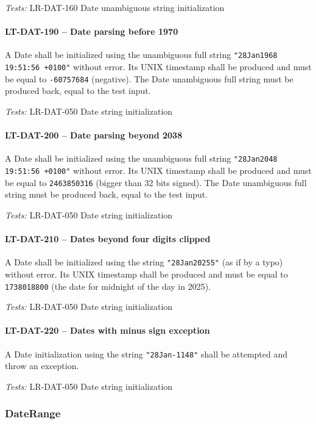 \textit{Tests: } LR-DAT-160 Date unambiguous string initialization

\paragraph{LT-DAT-190 -- Date parsing before 1970}
A Date shall be initialized using the unambiguous full string
\lstinline{"28Jan1968 19:51:56 +0100"} without error.
Its UNIX timestamp shall be produced and must be equal to
\lstinline{-60757684} (negative).
The Date unambiguous full string must be produced back,
equal to the test input.

\textit{Tests: } LR-DAT-050 Date string initialization

\paragraph{LT-DAT-200 -- Date parsing beyond 2038}
A Date shall be initialized using the unambiguous
full string \lstinline{"28Jan2048 19:51:56 +0100"} without error.
Its UNIX timestamp shall be produced and must be equal to
\lstinline{2463850316} (bigger than 32 bits signed).
The Date unambiguous full string must be produced back,
equal to the test input.

\textit{Tests: } LR-DAT-050 Date string initialization

\paragraph{LT-DAT-210 -- Dates beyond four digits clipped}
A Date shall be initialized using the string
\lstinline{"28Jan20255"} (as if by a typo) without error.
Its UNIX timestamp shall be produced and must be equal to
\lstinline{1738018800} (the date for midnight of the day in 2025).

\textit{Tests: } LR-DAT-050 Date string initialization

\paragraph{LT-DAT-220 -- Dates with minus sign exception}
A Date initialization using the string \lstinline{"28Jan-1148"}
shall be attempted and throw an exception.

\textit{Tests: } LR-DAT-050 Date string initialization

\subsubsection{DateRange}

